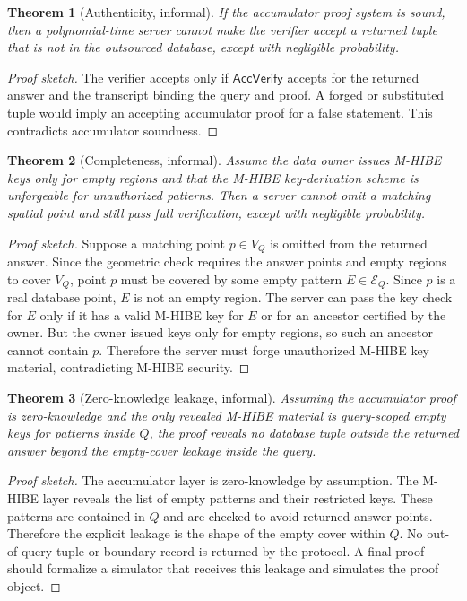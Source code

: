 \documentclass[11pt]{article}
\newtheorem{theorem}{Theorem}
\begin{document}
\begin{theorem}[Authenticity, informal]
If the accumulator proof system is sound, then a polynomial-time server cannot make the verifier accept a returned tuple that is not in the outsourced database, except with negligible probability.
\end{theorem}

\begin{proof}[Proof sketch]
The verifier accepts only if $\mathsf{AccVerify}$ accepts for the returned answer and the transcript binding the query and proof. A forged or substituted tuple would imply an accepting accumulator proof for a false statement. This contradicts accumulator soundness.
\end{proof}

\begin{theorem}[Completeness, informal]
Assume the data owner issues M-HIBE keys only for empty regions and that the M-HIBE key-derivation scheme is unforgeable for unauthorized patterns. Then a server cannot omit a matching spatial point and still pass full verification, except with negligible probability.
\end{theorem}

\begin{proof}[Proof sketch]
Suppose a matching point $p\in V_Q$ is omitted from the returned answer. Since the geometric check requires the answer points and empty regions to cover $V_Q$, point $p$ must be covered by some empty pattern $E\in\mathcal{E}_Q$. Since $p$ is a real database point, $E$ is not an empty region. The server can pass the key check for $E$ only if it has a valid M-HIBE key for $E$ or for an ancestor certified by the owner. But the owner issued keys only for empty regions, so such an ancestor cannot contain $p$. Therefore the server must forge unauthorized M-HIBE key material, contradicting M-HIBE security.
\end{proof}

\begin{theorem}[Zero-knowledge leakage, informal]
Assuming the accumulator proof is zero-knowledge and the only revealed M-HIBE material is query-scoped empty keys for patterns inside $Q$, the proof reveals no database tuple outside the returned answer beyond the empty-cover leakage inside the query.
\end{theorem}

\begin{proof}[Proof sketch]
The accumulator layer is zero-knowledge by assumption. The M-HIBE layer reveals the list of empty patterns and their restricted keys. These patterns are contained in $Q$ and are checked to avoid returned answer points. Therefore the explicit leakage is the shape of the empty cover within $Q$. No out-of-query tuple or boundary record is returned by the protocol. A final proof should formalize a simulator that receives this leakage and simulates the proof object.
\end{proof}
\end{document}
